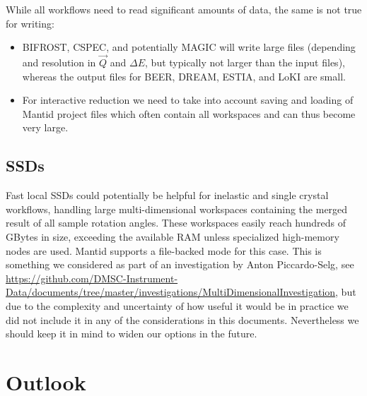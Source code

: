 \documentclass[a4paper,english,numbers=noenddot,bibliography=totoc,chapterprefix=on,DIV=12]{scrartcl}
\newcommand{\beer}{BEER\xspace}
\newcommand{\bifrost}{BIFROST\xspace}
\newcommand{\cspec}{CSPEC\xspace}
\newcommand{\dream}{DREAM\xspace}
\newcommand{\estia}{ESTIA\xspace}
\newcommand{\loki}{LoKI\xspace}
\newcommand{\magic}{MAGIC\xspace}
\newcommand{\mantid}{Mantid\xspace}
\begin{document}
While all workflows need to read significant amounts of data, the same is not true for writing:
\begin{itemize}
  \item \bifrost, \cspec, and potentially \magic will write large files (depending and resolution in $\vec Q$ and $\Delta E$, but typically not larger than the input files), whereas the output files for \beer, \dream, \estia, and \loki are small.
  \item For interactive reduction we need to take into account saving and loading of \mantid project files which often contain all workspaces and can thus become very large.
\end{itemize}


\subsection{SSDs}

Fast local SSDs could potentially be helpful for inelastic and single crystal workflows, handling large multi-dimensional workspaces containing the merged result of all sample rotation angles.
These workspaces easily reach hundreds of GBytes in size, exceeding the available RAM unless specialized high-memory nodes are used.
\mantid supports a file-backed mode for this case.
This is something we considered as part of an investigation by Anton Piccardo-Selg, see \url{https://github.com/DMSC-Instrument-Data/documents/tree/master/investigations/MultiDimensionalInvestigation}, but due to the complexity and uncertainty of how useful it would be in practice we did not include it in any of the considerations in this documents.
Nevertheless we should keep it in mind to widen our options in the future.




\section{Outlook}
\end{document}
